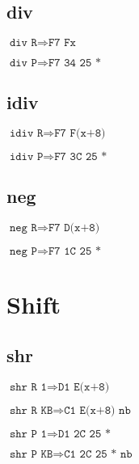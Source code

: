 \documentclass{article}
\begin{document}
\subsection{div}
\begin{minipage}{\textwidth}

$\texttt{div R} \Rightarrow \texttt{F7 Fx}$

$\texttt{div P} \Rightarrow \texttt{F7 34 25 *}$

\end{minipage}


\subsection{idiv}
\begin{minipage}{\textwidth}

$\texttt{idiv R} \Rightarrow \texttt{F7 F(x+8)}$

$\texttt{idiv P} \Rightarrow \texttt{F7 3C 25 *}$

\end{minipage}


\subsection{neg}
\begin{minipage}{\textwidth}

$\texttt{neg R} \Rightarrow \texttt{F7 D(x+8)}$

$\texttt{neg P} \Rightarrow \texttt{F7 1C 25 *}$

\end{minipage}


\section{Shift}

\subsection{shr}
\begin{minipage}{\textwidth}

$\texttt{shr R 1} \Rightarrow \texttt{D1 E(x+8)}$

$\texttt{shr R KB} \Rightarrow \texttt{C1 E(x+8) nb}$

$\texttt{shr P 1} \Rightarrow \texttt{D1 2C 25 *}$

$\texttt{shr P KB} \Rightarrow \texttt{C1 2C 25 * nb}$

\end{minipage}
\end{document}
